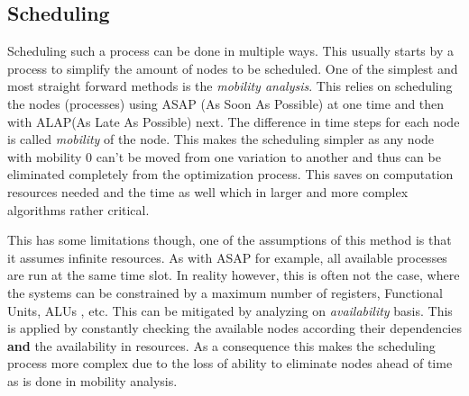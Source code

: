 \documentclass[conference]{IEEEtran}
\begin{document}
\subsection{Scheduling}
Scheduling such a process can be done in multiple ways. This usually starts by a process to simplify the amount of nodes to be scheduled. One of the simplest and most straight forward methods is the  \textit{mobility analysis}\cite{8252679}. This relies on scheduling the nodes (processes) using ASAP (As Soon As Possible) at one time and then with ALAP(As Late As Possible) next. The difference in time steps for each node is called \textit{mobility} of the node. This makes the scheduling simpler as any node with mobility 0 can't be moved from one variation to another and thus can be eliminated completely from the optimization process. This saves on computation resources needed and the time as well which in larger and more complex algorithms rather critical.

This has some limitations though, one of the assumptions of this method is that it assumes infinite resources. As with ASAP for example, all available processes are run at the same time slot. In reality however, this is often not the case, where the systems can be constrained by a maximum number of registers, Functional Units, ALUs , etc. This can be mitigated by analyzing on \textit{availability} basis. This is applied by constantly checking the available nodes according their dependencies \textbf{and} the availability in resources. As a consequence this makes the scheduling process more complex due to the loss of ability to eliminate nodes ahead of time as is done in mobility analysis.
\end{document}
